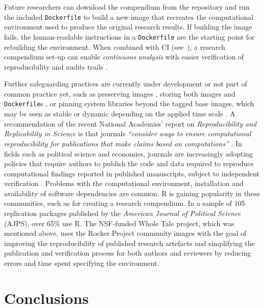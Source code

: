 Future researchers can download the compendium from the repository and
run the included \texttt{Dockerfile} to build a new image that recreates
the computational environment used to produce the original research
results. If building the image fails, the human-readable instructions in
a \texttt{Dockerfile} are the starting point for rebuilding the
environment. When combined with CI (see~), a research
compendium set-up can enable \emph{continuous analysis} with easier
verification of reproducibility and audits trails
\citep{beaulieu-jones_reproducibility_2017}.

Further safeguarding practices are currently under development or not
part of common practice yet, such as preserving images
\citep{emsley_framework_2018}, storing both images and
\texttt{Dockerfile}s \citep[cf.][]{nust_opening_2017}, or pinning system
libraries beyond the tagged base images, which may be seen as stable or
dynamic depending on the applied time scale
\citep[see discussion on \texttt{debian:testing} base image in][]{RJ-2017-065}.
A recommendation of the recent National Academies' report on
\emph{Reproducibility and Replicability in Science} is that journals
\emph{``consider ways to ensure computational reproducibility for
publications that make claims based on computations''}
\citep{NASEM2019}. In fields such as political science and economics,
journals are increasingly adopting policies that require authors to
publish the code and data required to reproduce computational findings
reported in published manuscripts, subject to independent verification
\citep{Jacoby2017,Vilhuber2019,Alvarez2018,Christian2018,Eubank2016,King1995}.
Problems with the computational environment, installation and
availability of software dependencies are common. R is gaining
popularity in these communities, such as for creating a research
compendium. In a sample of 105 replication packages published by the
\emph{American Journal of Political Science} (AJPS), over 65\% use R.
The NSF-funded Whole Tale project, which was mentioned above, uses the
Rocker Project community images with the goal of improving the
reproducibility of published research artefacts and simplifying the
publication and verification process for both authors and reviewers by
reducing errors and time spent specifying the environment.

\hypertarget{conclusions}{%
\section{Conclusions}\label{conclusions}}

